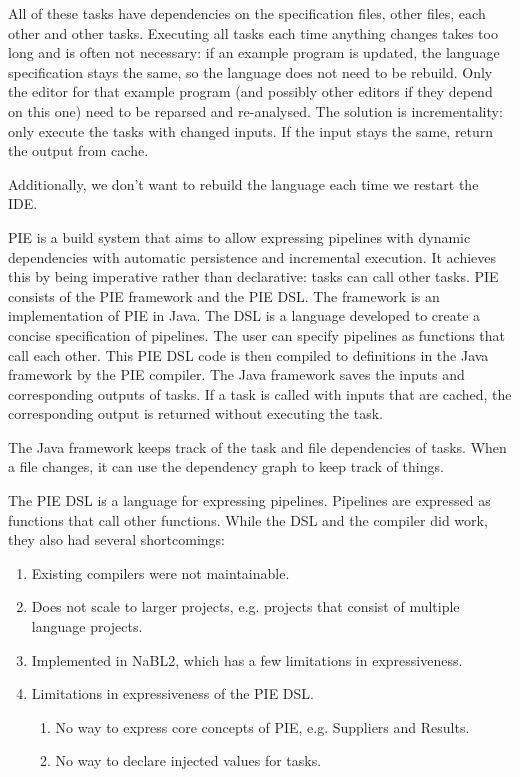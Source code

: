 All of these tasks have dependencies on the specification files, other files, each other and other tasks.
Executing all tasks each time anything changes takes too long and is often not necessary: if an example program is updated, the language specification stays the same, so the language does not need to be rebuild.
Only the editor for that example program (and possibly other editors if they depend on this one) need to be reparsed and re-analysed.
The solution is incrementality: only execute the tasks with changed inputs.
If the input stays the same, return the output from cache.

Additionally, we don't want to rebuild the language each time we restart the IDE.


\Ac{PIE} is a build system that aims to allow expressing pipelines with dynamic dependencies with automatic persistence and incremental execution.
It achieves this by being imperative rather than declarative: tasks can call other tasks.
\Ac{PIE} consists of the PIE framework and the \ac{PIE} \ac{DSL}.
The framework is an implementation of \ac{PIE} in Java.
The \ac{DSL} is a language developed to create a concise specification of pipelines.
The user can specify pipelines as functions that call each other.
This \ac{PIE} \ac{DSL} code is then compiled to definitions in the Java framework by the \ac{PIE} compiler.
The Java framework saves the inputs and corresponding outputs of tasks.
If a task is called with inputs that are cached, the corresponding output is returned without executing the task.

The Java framework keeps track of the task and file dependencies of tasks.
When a file changes, it can use the dependency graph to keep track of things.

The PIE DSL is a language for expressing pipelines.
Pipelines are expressed as functions that call other functions.
While the DSL and the compiler did work, they also had several shortcomings:
\begin{enumerate}
  \item Existing compilers were not maintainable.
  \item Does not scale to larger projects, e.g. projects that consist of multiple language projects.
  \item Implemented in NaBL2, which has a few limitations in expressiveness.
  \item Limitations in expressiveness of the PIE DSL.
  \begin{enumerate}
    \item No way to express core concepts of PIE, e.g. Suppliers and Results.
    \item No way to declare injected values for tasks.
  \end{enumerate}
\end{enumerate}


